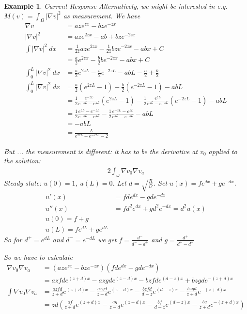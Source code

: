 \documentclass[12pt]{amsproc}
\newtheorem{example}{Example}
\begin{document}
\begin{example}{Current Response}
Alternatively, we might be interested in e.g. $M(v)=\int_\Omega |\nabla v|^2$
as measurement. We have
\begin{align*}
  \nabla v&=a z e^{zx} - b z e^{-zx}\\
  |\nabla v|^2&=a z e^{2zx} -ab +  b z e^{-2zx}\\
  \int  |\nabla v|^2 \; dx &=  \frac{1}{2z}aze^{2zx}  -\frac{1}{2z}  b z e^{-2zx} - abx + C\\
          &= \frac{a}{2}e^{2zx}  -\frac{b}{2}  b e^{-2zx} -abx +C\\
  \int_0^L  |\nabla v|^2 \; dx &=   \frac{a}{2}e^{2zL}  -\frac{b}{2}  e^{-2zL} -abL
            -  \frac{a}{2}  +\frac{b}{2}\\
  \int_0^L  |\nabla v|^2 \; dx &=   \frac{a}{2}(e^{2zL}-1)  -\frac{b}{2} (e^{-2zL}-1) -abL\\
                               &=    \frac12\frac{e^{-zL}}{e^{-zL}-e^{zL}}(e^{2zL}-1)  -\frac12\frac{e^{zL}}{e^{zL}-e^{-zL}} (e^{-2zL}-1) -abL\\
          &=    \frac12\frac{e^{zL}-e^{-zL}}{e^{-zL}-e^{zL}}  -\frac12\frac{e^{-zL}-e^{zL}}{e^{zL}-e^{-zL}} -abL\\
              &=-abL\\
  &= \frac{L}{e^{2zL} + e^{-2zL}-2}
\end{align*}

But ... the measurement is different: it has to be the derivative at $v_0$ applied to the solution:
\begin{align*}
  2\int_\omega \nabla v_0 \nabla v_a 
\end{align*}
Steady state: $u(0)=1$, $u(L)=0$. Let $d=\sqrt{\frac{R}{D}}$.
Set $u(x)=fe^{dx}+ ge^{-dx}$. 
\begin{align*}
  u'(x) &= fd e^{dx} -gde^{-dx}\\
  u''(x) &= fd^2 e^{dx} +gd^2e^{-dx}=d^2 u(x)\\
  u(0)=f+g\\
  u(L)=fe^{dL}+ge^{dL}
\end{align*}
So for $d^+=e^{dL}$ and $d^-=e^{-dL}$ we get
$f=\frac{d^-}{d^--d^+}$ and $g=\frac{d^+}{d^+-d^-}$ 

So we have to calculate
\begin{align*}
  \nabla v_0 \nabla v_a&=  (aze^{zx}-bze^{-zx})(fde^{dx}-gde^{-dx})\\
                       &= azfde^{(z+d)x} -azgde^{(z-d)x}  - bzfde^{(d-z)x} + bzgde^{-(z+d)x}\\
  \int \nabla v_0 \nabla v_a &=   \frac{azfd}{z+d}e^{(z+d)x} -\frac{azgd}{z-d}e^{(z-d)x}  - \frac{bzfd}{d-z}e^{(d-z)x} - \frac{bzgd}{z+d}e^{-(z+d)x}\\
  &=  zd\left(\frac{af}{z+d}e^{(z+d)x} -\frac{ag}{z-d}e^{(z-d)x}  - \frac{bf}{d-z}e^{(d-z)x} - \frac{bg}{z+d}e^{-(z+d)x}\right)
\end{align*}

\end{example}
\end{document}
